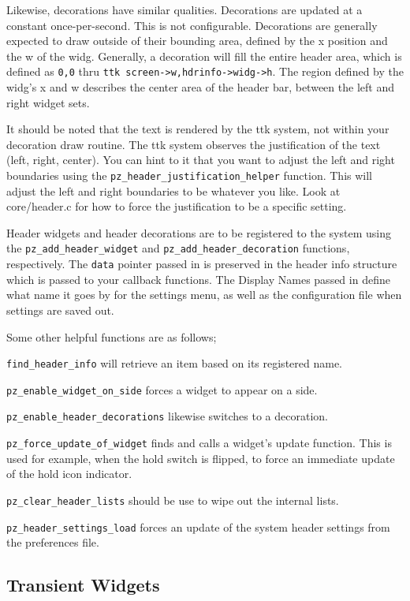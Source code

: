 \documentclass[12pt,letterpaper]{report}
\begin{document}
Likewise, decorations have similar qualities.  Decorations are
updated at a constant once-per-second.  This is not configurable.
Decorations are generally expected to draw outside of their bounding
area, defined by the x position and the w of the widg.  Generally,
a decoration will fill the entire header area, which is defined as
\verb|0,0| thru \verb|ttk screen->w,hdrinfo->widg->h|.  The region
defined by the widg's x and w describes the center area of the
header bar, between the left and right widget sets.

It should be noted that the text is rendered by the ttk system, not
within your decoration draw routine.  The ttk system observes the
justification of the text (left, right, center).  You can hint to
it that you want to adjust the left and right boundaries using the
\verb|pz_header_justification_helper| function.  This will adjust
the left and right boundaries to be whatever you like.  Look at
core/header.c for how to force the justification to be a specific
setting.

Header widgets and header decorations are to be registered to the
system using the \verb|pz_add_header_widget| and
\verb|pz_add_header_decoration| functions, respectively.  The
\verb|data| pointer passed in is preserved in the header info
structure which is passed to your callback functions.
The Display Names passed in define what name it goes by for the 
settings menu, as well as the configuration file when settings are
saved out.

Some other helpful functions are as follows;

\verb|find_header_info| will retrieve an item based on its registered name.

\verb|pz_enable_widget_on_side| forces a widget to appear on a side.

\verb|pz_enable_header_decorations| likewise switches to a decoration.

\verb|pz_force_update_of_widget| finds and calls a widget's update
function.  This is used for example, when the hold switch is flipped,
to force an immediate update of the hold icon indicator.

\verb|pz_clear_header_lists| should be use to wipe out the internal lists.

\verb|pz_header_settings_load| forces an update of the system header settings from the preferences file.


\subsection{Transient Widgets}
\end{document}

